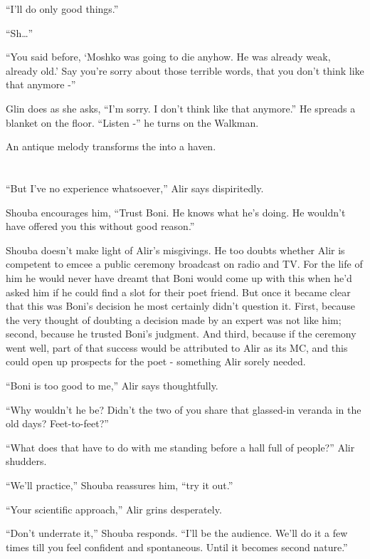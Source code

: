 \documentclass[twoside,11pt]{book}
\begin{document}
``I'll do only good things.''

``Sh\dots''

``You said before, `Moshko was going to die anyhow. He was already weak, already old.' Say you're sorry
about those terrible words, that you don't think like that anymore -''

Glin does as she asks, ``I'm sorry. I don't think like that anymore.'' He spreads a blanket on
the floor. ``Listen -'' he turns on the Walkman.

An antique melody transforms the into a haven.


\bigskip

\chapter{}

``But I've no experience whatsoever,'' Alir says dispiritedly.

Shouba encourages him, ``Trust Boni. He knows what he's doing. He wouldn't have offered you this without
good reason.''

Shouba doesn't make light of Alir's misgivings. He too doubts whether Alir is competent to emcee a public ceremony
broadcast on radio and TV. For the life of him he would never have dreamt that Boni would come up with this when he'd
asked him if he could find a slot for their poet friend. But once it became clear that this was Boni's decision he most
certainly didn't question it. First, because the very thought of doubting a decision made by an expert was not like
him; second, because he trusted Boni's judgment. And third, because if the ceremony went well, part of that success
would be attributed to Alir as its MC, and this could open up prospects for the poet - something Alir sorely needed.

``Boni is too good to me,'' Alir says thoughtfully.

``Why wouldn't he be? Didn't the two of you share that glassed-in veranda in the old days?
Feet-to-feet?''

``What does that have to do with me standing before a hall full of people?'' Alir shudders.

``We'll practice,'' Shouba reassures him, ``try it out.''

``Your scientific approach,'' Alir grins desperately.

``Don't underrate it,'' Shouba responds. ``I'll be the audience. We'll do it a
few times till you feel confident and spontaneous. Until it becomes second nature.''
\end{document}
